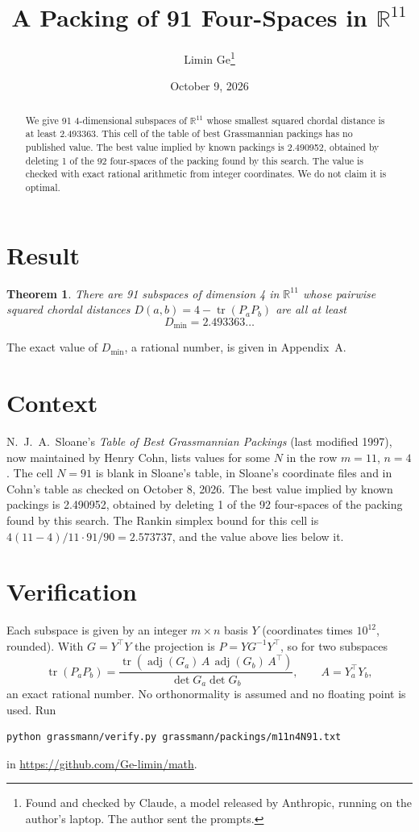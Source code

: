 \documentclass[11pt,a4paper]{article}
\title{A Packing of 91 Four-Spaces in $\mathbb{R}^{11}$}
\author{Limin Ge\thanks{Found and checked by Claude, a model released by Anthropic, running on the author's laptop. The author sent the prompts.}}
\date{October 9, 2026}
\newtheorem*{theorem}{Theorem}
\begin{document}
\maketitle
\begin{abstract}
We give 91 4-dimensional subspaces of $\mathbb{R}^{11}$ whose smallest squared chordal distance is at least 2.493363. This cell of the table of best Grassmannian packings has no published value. The best value implied by known packings is 2.490952, obtained by deleting 1 of the 92 four-spaces of the packing found by this search. The value is checked with exact rational arithmetic from integer coordinates. We do not claim it is optimal.
\end{abstract}

\section{Result}
\begin{theorem}
There are 91 subspaces of dimension 4 in $\mathbb{R}^{11}$ whose pairwise squared chordal distances $D(a,b) = 4 - \operatorname{tr}(P_aP_b)$ are all at least
\[ D_{\min} = 2.493363\ldots \]
\end{theorem}
The exact value of $D_{\min}$, a rational number, is given in Appendix~A.


\section{Context}
N.~J.~A.~Sloane's \emph{Table of Best Grassmannian Packings} (last modified 1997), now maintained by Henry Cohn, lists values for some $N$ in the row $m=11$, $n=4$. The cell $N=91$ is blank in Sloane's table, in Sloane's coordinate files and in Cohn's table as checked on October 8, 2026. The best value implied by known packings is 2.490952, obtained by deleting 1 of the 92 four-spaces of the packing found by this search. The Rankin simplex bound for this cell is $4(11-4)/11\cdot 91/90 = 2.573737$, and the value above lies below it.


\section{Verification}
Each subspace is given by an integer $m\times n$ basis $Y$ (coordinates times $10^{12}$, rounded). With $G=Y^\top Y$ the projection is $P=YG^{-1}Y^\top$, so for two subspaces
\[ \operatorname{tr}(P_aP_b)=\frac{\operatorname{tr}(\operatorname{adj}(G_a)\,A\,\operatorname{adj}(G_b)\,A^\top)}{\det G_a\det G_b},\qquad A=Y_a^\top Y_b, \]
an exact rational number. No orthonormality is assumed and no floating point is used. Run
\begin{verbatim}
python grassmann/verify.py grassmann/packings/m11n4N91.txt
\end{verbatim}
in \url{https://github.com/Ge-limin/math}.
\end{document}
